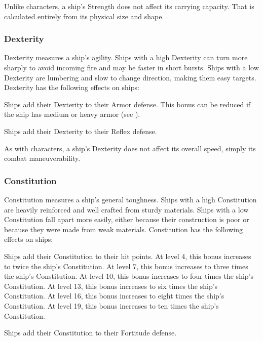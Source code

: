       Unlike characters, a ship's Strength does not affect its carrying capacity.
      That is calculated entirely from its physical size and shape.

    \subsubsection{Dexterity}
      Dexterity measures a ship's agility.
      Ships with a high Dexterity can turn more sharply to avoid incoming fire and may be faster in short bursts.
      Ships with a low Dexterity are lumbering and slow to change direction, making them easy targets.
      Dexterity has the following effects on ships:
      \begin{raggeditemize}
        \item Ships add their Dexterity to their Armor defense.
          This bonus can be reduced if the ship has medium or heavy armor (see ).
        \item Ships add their Dexterity to their Reflex defense.
      \end{raggeditemize}

      As with characters, a ship's Dexterity does not affect its overall speed, simply its combat maneuverability.

    \subsubsection{Constitution}
      Constitution measures a ship's general toughness.
      Ships with a high Constitution are heavily reinforced and well crafted from sturdy materials.
      Ships with a low Constitution fall apart more easily, either because their construction is poor or because they were made from weak materials.
      Constitution has the following effects on ships:
      \begin{raggeditemize}
        \item Ships add their Constitution to their hit points.
          At level 4, this bonus increases to twice the ship's Constitution.
          At level 7, this bonus increases to three times the ship's Constitution.
          At level 10, this bonus increases to four times the ship's Constitution.
          At level 13, this bonus increases to six times the ship's Constitution.
          At level 16, this bonus increases to eight times the ship's Constitution.
          At level 19, this bonus increases to ten times the ship's Constitution.
        \item Ships add their Constitution to their Fortitude defense.
      \end{raggeditemize}

